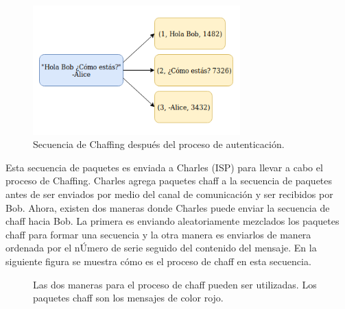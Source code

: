\documentclass[12pt, a4paper, titlepage]{article}
\begin{document}
		\begin{figure}[H]
			\begin{center}	                  \includegraphics[width=8cm]{./imagenes/descomposicionChaffing.png}
				\caption{Secuencia de Chaffing después del proceso de autenticación.}
			\end{center}
		\end{figure}
		
		Esta secuencia de paquetes es enviada a Charles (ISP) para llevar a cabo el proceso de Chaffing. Charles agrega paquetes chaff a la secuencia de paquetes antes de ser enviados por medio del canal de comunicación y ser recibidos por Bob. Ahora, existen dos maneras donde Charles puede enviar la secuencia de chaff hacia Bob. La primera es enviando aleatoriamente mezclados los paquetes chaff para formar una secuencia y la otra manera es enviarlos de manera ordenada por el nÚmero de serie seguido del contenido del mensaje. En la siguiente figura se muestra cómo es el proceso de chaff en esta secuencia.
		
		\begin{figure}[H]
         \centering
         \caption{Las dos maneras para el proceso de chaff pueden ser utilizadas. Los paquetes chaff son los mensajes de color rojo.}
         \label{f:Enfoques}
        \end{figure}
		
\end{document}

